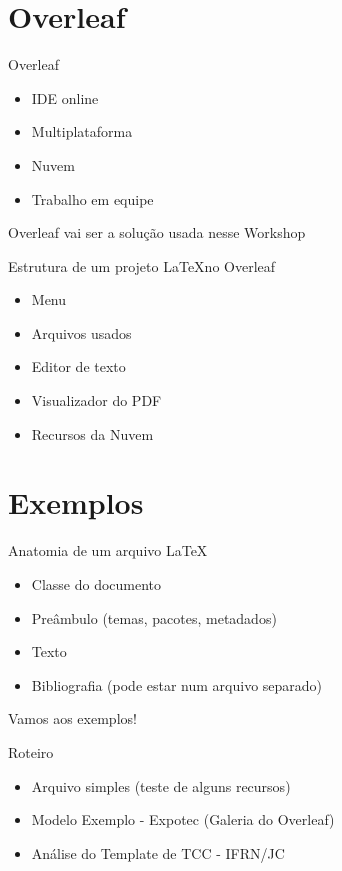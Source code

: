 \documentclass[aspectratio=169,xcolor=dvipsnames]{beamer}
\begin{document}
\section{Overleaf}

\begin{frame}{Overleaf}
    \begin{itemize}
        \item IDE online
        \item Multiplataforma
        \item Nuvem
        \item Trabalho em equipe
    \end{itemize}
    Overleaf vai ser a solução usada nesse Workshop
\end{frame}



\begin{frame}{Estrutura de um projeto \LaTeX no Overleaf }
     \begin{itemize}
        \item Menu
        \item Arquivos usados
        \item Editor de texto
        \item Visualizador do PDF
        \item Recursos da Nuvem
    \end{itemize}
\end{frame}

\section{Exemplos}

\begin{frame}{Anatomia de um arquivo \LaTeX}
    \begin{itemize}
        \item Classe do documento 
        \item Preâmbulo (temas, pacotes, metadados)
        \item Texto
        \item Bibliografia (pode estar num arquivo separado)
    \end{itemize}
\end{frame}

\begin{frame}
    \Huge{\centerline{Vamos aos exemplos!}}
\end{frame}

\begin{frame}{Roteiro}
    \begin{itemize}
        \item Arquivo simples (teste de alguns recursos)
        \item Modelo Exemplo - Expotec (Galeria do Overleaf)
        \item Análise do Template de TCC - IFRN/JC
    \end{itemize}
\end{frame}
\end{document}
